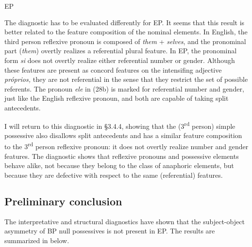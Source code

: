 \documentclass[output=paper]{langsci/langscibook}
\begin{document}
\ea%
    EP\label{ex:wein:28}\\
    \z
\z

The diagnostic has to be evaluated differently for EP. It seems that this result is better related to the feature composition of the nominal elements. In English, the third person reflexive pronoun is composed of \textit{them} + \textit{selves}, and the pronominal part (\textit{them}) overtly realizes a referential plural feature. In EP, the pronominal form \textit{si} does not overtly realize either referential number or gender. Although these features are present as concord features on the intensifing adjective \textit{próprios,} they are not referential in the sense that they restrict the set of possible referents. The pronoun \textit{ele} in (28b) is marked for referential number and gender, just like the English reflexive pronoun, and both are capable of taking split antecedents.

I will return to this diagnostic in §3.4.4, showing that the (3\textsuperscript{rd} person) simple possessive also disallows split antecedents and has a similar feature composition to the 3\textsuperscript{rd} person reflexive pronoun: it does not overtly realize number and gender features. The diagnostic shows that reflexive pronouns and possessive elements behave alike, not because they belong to the class of anaphoric elements, but because they are defective with respect to the same (referential) features.

\subsection{Preliminary conclusion}%

The interpretative and structural diagnostics have shown that the subject-object asymmetry of BP null possessives is not present in EP. The results are summarized in  below.
\end{document}
